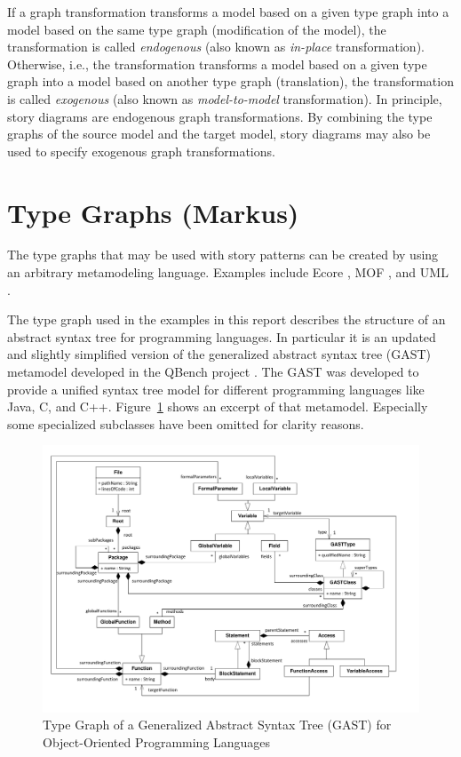 If a graph transformation transforms a model based on a given type graph into a model based on the same type graph (modification of the model), the transformation is called \emph{endogenous} (also known as \emph{in-place} transformation). Otherwise, i.e., the transformation transforms a model based on a given type graph into a model based on another type graph (translation), the transformation is called \emph{exogenous} (also known as \emph{model-to-model} transformation). In principle, story diagrams are endogenous graph transformations. By combining the type graphs of the source model and the target model, story diagrams may also be used to specify exogenous graph transformations.


\section{Type Graphs (Markus)}
\label{sec:typeGraph}

The type graphs that may be used with story patterns can be created by using an arbitrary metamodeling language. Examples include Ecore \cite{SBP+08}, MOF \cite{MOF05}, and UML \cite{UML23}.

The type graph used in the examples in this report describes the structure of an abstract syntax tree for programming languages.
In particular it is an updated and slightly simplified version of the generalized abstract syntax tree (GAST) metamodel developed in the QBench project \cite{QBench}.
The GAST was developed to provide a unified syntax tree model for different programming languages like Java, C, and C++.
Figure~\ref{fig:gast-mm} shows an excerpt of that metamodel.
Especially some specialized subclasses have been omitted for clarity reasons.

\begin{figure}[htbp]
  \centering
  \includegraphics[width=\linewidth]{figures/gast-mm}
  \caption{Type Graph of a Generalized Abstract Syntax Tree (GAST) for Object-Oriented Programming Languages}
  \label{fig:gast-mm}
\end{figure}


